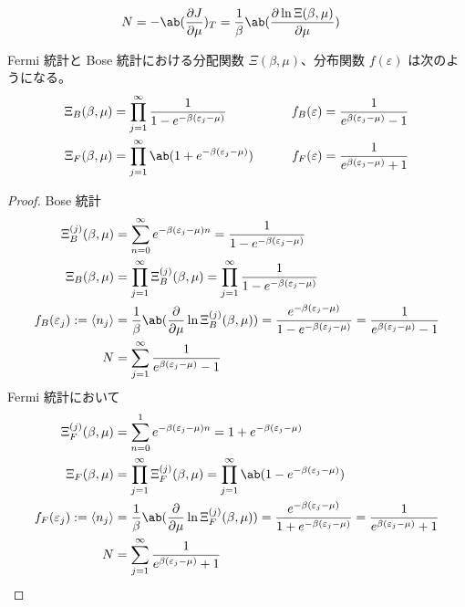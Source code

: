 \documentclass[a4paper,11pt]{jlreq}
\begin{document}
\begin{align}
  N & = -\ab(\diffp{J}{\mu})_T = \frac{1}{\beta}\ab(\diffp{\ln\Xi(\beta,\mu)}{\mu})
\end{align}

\begin{theorem}[分配関数と分布関数]
  Fermi 統計と Bose 統計における分配関数 $\Xi(\beta,\mu)$、分布関数 $f(\varepsilon)$ は次のようになる。
  \begin{alignat}{3}
    \Xi_B(\beta, \mu) & = \prod_{j=1}^{\infty}\frac{1}{1 - e^{-\beta(\varepsilon_j - \mu)}} & \qquad f_B(\varepsilon) & = \frac{1}{e^{\beta(\varepsilon_j - \mu)} - 1} \\
    \Xi_F(\beta, \mu) & = \prod_{j=1}^{\infty}\ab(1 + e^{-\beta(\varepsilon_j - \mu)})      & \qquad f_F(\varepsilon) & = \frac{1}{e^{\beta(\varepsilon_j - \mu)} + 1}
  \end{alignat}
\end{theorem}
\begin{proof}
  Bose 統計
  \begin{align}
    \Xi_B^{(j)}(\beta, \mu)                  & = \sum_{n=0}^{\infty}e^{-\beta(\varepsilon_j - \mu)n} = \frac{1}{1 - e^{-\beta(\varepsilon_j - \mu)}}                                                                                     \\
    \Xi_B(\beta, \mu)                        & = \prod_{j=1}^{\infty}\Xi_B^{(j)}(\beta, \mu) = \prod_{j=1}^{\infty}\frac{1}{1 - e^{-\beta(\varepsilon_j - \mu)}}                                                                         \\
    f_B(\varepsilon_j) := \langle n_j\rangle & = \frac{1}{\beta}\ab(\diffp{}{\mu}\ln\Xi_B^{(j)}(\beta,\mu)) = \frac{e^{-\beta(\varepsilon_j - \mu)}}{1 - e^{-\beta(\varepsilon_j - \mu)}} = \frac{1}{e^{\beta(\varepsilon_j - \mu)} - 1} \\
    N                                        & = \sum_{j=1}^{\infty}\frac{1}{e^{\beta(\varepsilon_j - \mu)} - 1}
  \end{align}
  Fermi 統計において
  \begin{align}
    \Xi_F^{(j)}(\beta, \mu)                  & = \sum_{n=0}^{1}e^{-\beta(\varepsilon_j - \mu)n} = 1 + e^{-\beta(\varepsilon_j - \mu)}                                                                                                    \\
    \Xi_F(\beta, \mu)                        & = \prod_{j=1}^{\infty}\Xi_F^{(j)}(\beta, \mu) = \prod_{j=1}^{\infty}\ab(1 - e^{-\beta(\varepsilon_j - \mu)})                                                                              \\
    f_F(\varepsilon_j) := \langle n_j\rangle & = \frac{1}{\beta}\ab(\diffp{}{\mu}\ln\Xi_F^{(j)}(\beta,\mu)) = \frac{e^{-\beta(\varepsilon_j - \mu)}}{1 + e^{-\beta(\varepsilon_j - \mu)}} = \frac{1}{e^{\beta(\varepsilon_j - \mu)} + 1} \\
    N                                        & = \sum_{j=1}^{\infty}\frac{1}{e^{\beta(\varepsilon_j - \mu)} + 1}
  \end{align}
\end{proof}
\end{document}
